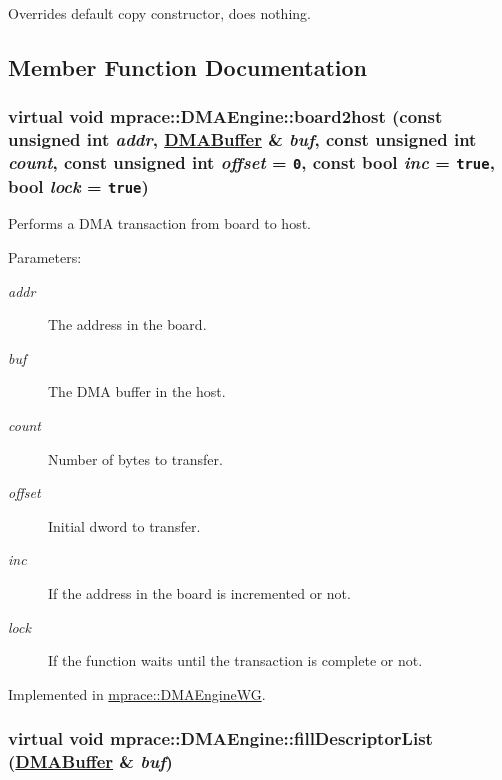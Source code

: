 Overrides default copy constructor, does nothing. 



\subsection{Member Function Documentation}
\hypertarget{classmprace_1_1DMAEngine_a4}{
\subsubsection[board2host]{\setlength{\rightskip}{0pt plus 5cm}virtual void mprace::DMAEngine::board2host (const unsigned int {\em addr}, \hyperlink{classmprace_1_1DMABuffer}{DMABuffer} \& {\em buf}, const unsigned int {\em count}, const unsigned int {\em offset} = {\tt 0}, const bool {\em inc} = {\tt true}, bool {\em lock} = {\tt true})}}
\label{classmprace_1_1DMAEngine_a4}


Performs a DMA transaction from board to host. 

\begin{Desc}
\item[Parameters:]
\begin{description}
\item[{\em addr}]The address in the board. \item[{\em buf}]The DMA buffer in the host. \item[{\em count}]Number of bytes to transfer. \item[{\em offset}]Initial dword to transfer. \item[{\em inc}]If the address in the board is incremented or not. \item[{\em lock}]If the function waits until the transaction is complete or not.\end{description}
\end{Desc}


Implemented in \hyperlink{classmprace_1_1DMAEngineWG_a5}{mprace::DMAEngine\-WG}.\hypertarget{classmprace_1_1DMAEngine_a5}{
\subsubsection[fillDescriptorList]{\setlength{\rightskip}{0pt plus 5cm}virtual void mprace::DMAEngine::fill\-Descriptor\-List (\hyperlink{classmprace_1_1DMABuffer}{DMABuffer} \& {\em buf})}}
\label{classmprace_1_1DMAEngine_a5}


